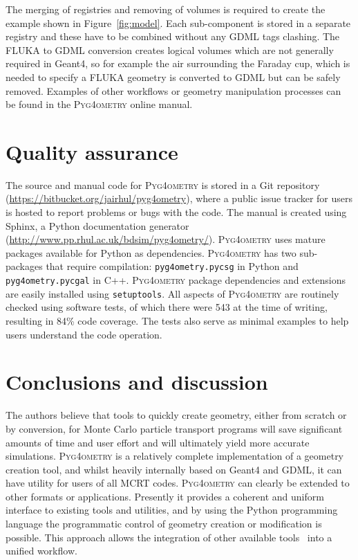 \documentclass[final,5p,times,twocolumn]{elsarticle}
\newcommand{\pyinline}[1]{\lstinline[postbreak={}]{#1}}
\newcommand{\PYGEOMETRY}{\textsc{Pyg4ometry}}
\begin{document}
The merging of registries and removing of volumes is required to create the example shown in Figure~\ref{fig:model}.
Each sub-component is stored in a separate registry and these have to be combined without any GDML tags clashing.
The FLUKA to GDML conversion creates logical volumes which are not generally required in Geant4, so for example
the air surrounding the Faraday cup, which is needed to specify a FLUKA geometry is converted to GDML but can be
safely removed. Examples of other workflows or geometry manipulation processes can be found in
the \PYGEOMETRY{} online manual.

\section{Quality assurance}
The source and manual code for \PYGEOMETRY{} is stored in a Git repository (\url{https://bitbucket.org/jairhul/pyg4ometry}),
where a public issue tracker for users is hosted to report problems or bugs with the code. The manual is created using Sphinx, a
Python documentation generator (\url{http://www.pp.rhul.ac.uk/bdsim/pyg4ometry/}). \PYGEOMETRY{} uses mature packages
available for Python as dependencies. \PYGEOMETRY{} has  two sub-packages
that require compilation: \pyinline{pyg4ometry.pycsg} in Python and
\pyinline{pyg4ometry.pycgal} in C++.
\PYGEOMETRY{} package dependencies and extensions are easily installed using
\pyinline{setuptools}. All aspects of \PYGEOMETRY{} are routinely checked
using software tests, of which there were 543 at the time of writing,
resulting in 84\% code coverage. The tests also serve as minimal examples to help users understand the code operation.

\section{Conclusions and discussion}
The authors believe that tools to quickly create geometry, either from scratch or by conversion,
for Monte Carlo particle transport programs
will save significant amounts of time and user effort and will ultimately
yield more accurate simulations. \PYGEOMETRY{} is a relatively complete implementation of a geometry
creation tool, and whilst heavily internally based on Geant4 and GDML, it can have utility for users of all MCRT
codes. \PYGEOMETRY{} can clearly be extended to other formats or applications. Presently it provides a coherent and
uniform interface to existing tools and utilities, and by using the Python programming language
 the programmatic control of geometry creation or modification is possible. This approach allows the integration of
other available tools~\cite{DavisNIMA915-65} into a unified workflow.
\end{document}

